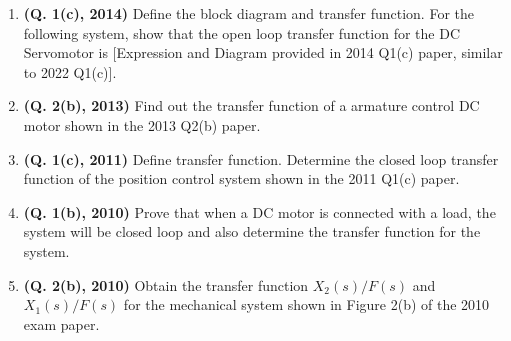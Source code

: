 \documentclass[12pt, a4paper]{article}
\begin{document}
\begin{enumerate}
		\item \textbf{(Q. 1(c), 2014)} Define the block diagram and transfer function. For the following system, show that the open loop transfer function for the DC Servomotor is [Expression and Diagram provided in 2014 Q1(c) paper, similar to 2022 Q1(c)].
		\item \textbf{(Q. 2(b), 2013)} Find out the transfer function of a armature control DC motor shown in the 2013 Q2(b) paper.
		\item \textbf{(Q. 1(c), 2011)} Define transfer function. Determine the closed loop transfer function of the position control system shown in the 2011 Q1(c) paper.
		\item \textbf{(Q. 1(b), 2010)} Prove that when a DC motor is connected with a load, the system will be closed loop and also determine the transfer function for the system.
		\item \textbf{(Q. 2(b), 2010)} Obtain the transfer function $X_2(s)/F(s)$ and $X_1(s)/F(s)$ for the mechanical system shown in Figure 2(b) of the 2010 exam paper.
	\end{enumerate}
	
\end{document}

